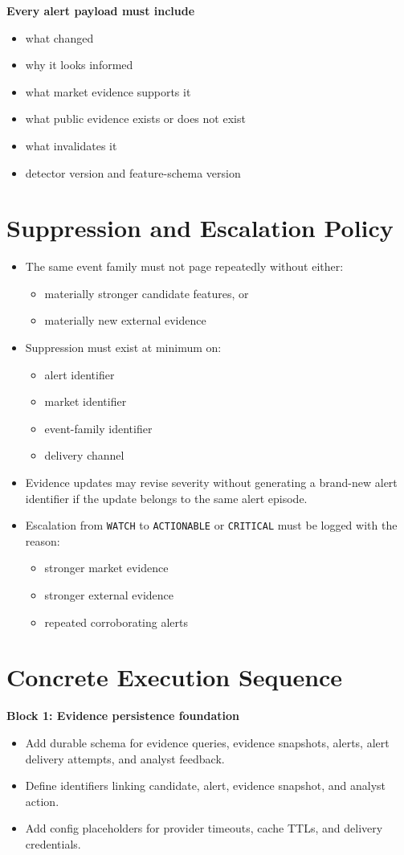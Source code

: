 \documentclass{article}
\begin{document}
\textbf{Every alert payload must include}
\begin{itemize}
\item what changed
\item why it looks informed
\item what market evidence supports it
\item what public evidence exists or does not exist
\item what invalidates it
\item detector version and feature-schema version
\end{itemize}

\section*{Suppression and Escalation Policy}
\begin{itemize}
\item The same event family must not page repeatedly without either:
\begin{itemize}
\item materially stronger candidate features, or
\item materially new external evidence
\end{itemize}
\item Suppression must exist at minimum on:
\begin{itemize}
\item alert identifier
\item market identifier
\item event-family identifier
\item delivery channel
\end{itemize}
\item Evidence updates may revise severity without generating a brand-new alert identifier if the update belongs to the same alert episode.
\item Escalation from \texttt{WATCH} to \texttt{ACTIONABLE} or \texttt{CRITICAL} must be logged with the reason:
\begin{itemize}
\item stronger market evidence
\item stronger external evidence
\item repeated corroborating alerts
\end{itemize}
\end{itemize}

\section*{Concrete Execution Sequence}
\textbf{Block 1: Evidence persistence foundation}
\begin{itemize}
\item Add durable schema for evidence queries, evidence snapshots, alerts, alert delivery attempts, and analyst feedback.
\item Define identifiers linking candidate, alert, evidence snapshot, and analyst action.
\item Add config placeholders for provider timeouts, cache TTLs, and delivery credentials.
\end{itemize}
\end{document}
